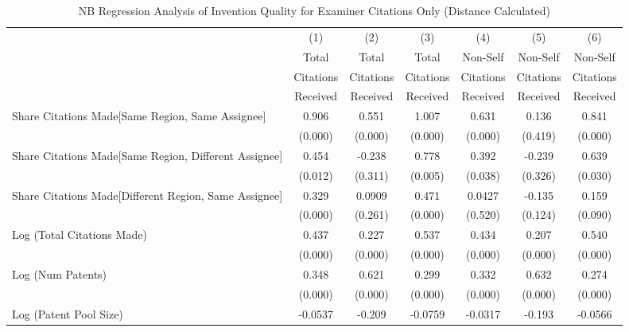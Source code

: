 \begin{table}[htbp]\centering
\caption{NB Regression Analysis of Invention Quality for Examiner Citations Only (Distance Calculated) \label{e.model123192021}}
\scriptsize
\singlespacing
\begin{tabular}{l*{6}{c}}
\hline\hline
                &\multicolumn{1}{c}{(1)}&\multicolumn{1}{c}{(2)}&\multicolumn{1}{c}{(3)}&\multicolumn{1}{c}{(4)}&\multicolumn{1}{c}{(5)}&\multicolumn{1}{c}{(6)}\\
                &\multicolumn{1}{c}{Total}&\multicolumn{1}{c}{Total}&\multicolumn{1}{c}{Total}&\multicolumn{1}{c}{Non-Self}&\multicolumn{1}{c}{Non-Self}&\multicolumn{1}{c}{Non-Self}\\
                &\multicolumn{1}{c}{Citations}&\multicolumn{1}{c}{Citations}&\multicolumn{1}{c}{Citations}&\multicolumn{1}{c}{Citations}&\multicolumn{1}{c}{Citations}&\multicolumn{1}{c}{Citations}\\
                 &\multicolumn{1}{c}{Received}&\multicolumn{1}{c}{Received}&\multicolumn{1}{c}{Received}&\multicolumn{1}{c}{Received}&\multicolumn{1}{c}{Received}&\multicolumn{1}{c}{Received}\\
\hline
Share Citations Made[Same Region, Same Assignee]&    0.906&    0.551&    1.007&    0.631&    0.136&    0.841\\
                &  (0.000)&  (0.000)&  (0.000)&  (0.000)&  (0.419)&  (0.000)\\
Share Citations Made[Same Region, Different Assignee]&    0.454&   -0.238&    0.778&    0.392&   -0.239&    0.639\\
                &  (0.012)&  (0.311)&  (0.005)&  (0.038)&  (0.326)&  (0.030)\\
Share Citations Made[Different Region, Same Assignee]&    0.329&   0.0909&    0.471&   0.0427&   -0.135&    0.159\\
                &  (0.000)&  (0.261)&  (0.000)&  (0.520)&  (0.124)&  (0.090)\\
Log (Total Citations Made)&    0.437&    0.227&    0.537&    0.434&    0.207&    0.540\\
                &  (0.000)&  (0.000)&  (0.000)&  (0.000)&  (0.000)&  (0.000)\\
Log (Num Patents)&    0.348&    0.621&    0.299&    0.332&    0.632&    0.274\\
                &  (0.000)&  (0.000)&  (0.000)&  (0.000)&  (0.000)&  (0.000)\\
Log (Patent Pool Size)&  -0.0537&   -0.209&  -0.0759&  -0.0317&   -0.193&  -0.0566\\

\end{tabular}
\end{table}
